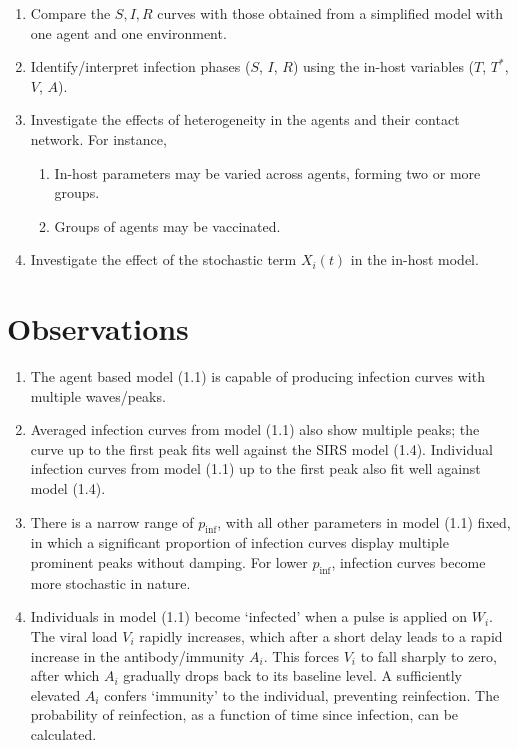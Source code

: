 \documentclass[11pt]{article}
\begin{document}
    \begin{enumerate}
        \item Compare the $S, I, R$ curves with those obtained from a
        simplified model with one agent and one environment.

        \item Identify/interpret infection phases ($S$, $I$, $R$) using the
        in-host variables ($T$, $T^*$, $V$, $A$).

        \item Investigate the effects of heterogeneity in the agents and their
        contact network. For instance,
        \begin{enumerate}
            \item In-host parameters may be varied across agents, forming two
            or more groups.
            \item Groups of agents may be vaccinated.
        \end{enumerate}

        \item Investigate the effect of the stochastic term $X_i(t)$ in the
        in-host model.
    \end{enumerate}


    \section{Observations}

    \begin{enumerate}
        \item The agent based model (1.1) is capable of producing infection
        curves with multiple waves/peaks.

        \item Averaged infection curves from model (1.1) also show multiple
        peaks; the curve up to the first peak fits well against the SIRS model
        (1.4). Individual infection curves from model (1.1) up to the first
        peak also fit well against model (1.4).

        \item There is a narrow range of $p_\text{inf}$, with all other
        parameters in model (1.1) fixed, in which a significant proportion of
        infection curves display multiple prominent peaks without damping. For
        lower $p_\text{inf}$, infection curves become more stochastic in
        nature.

        \item Individuals in model (1.1) become `infected' when a pulse is
        applied on $W_i$. The viral load $V_i$ rapidly increases, which after
        a short delay leads to a rapid increase in the antibody/immunity
        $A_i$. This forces $V_i$ to fall sharply to zero, after which $A_i$
        gradually drops back to its baseline level. A sufficiently elevated
        $A_i$ confers `immunity' to the individual, preventing reinfection.
        The probability of reinfection, as a function of time since infection,
        can be calculated.
    \end{enumerate}
\end{document}
